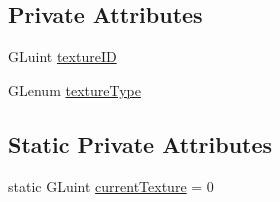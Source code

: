 \subsection*{Private Attributes}
\begin{DoxyCompactItemize}
\item 
G\+Luint \hyperlink{class_g_g_e_1_1_texture_a24eb48105f06bfe9c0b14d2ff84b50c6}{texture\+I\+D}
\item 
G\+Lenum \hyperlink{class_g_g_e_1_1_texture_a9fd9a4cf0a84fcd68b336c92d6d0514e}{texture\+Type}
\end{DoxyCompactItemize}
\subsection*{Static Private Attributes}
\begin{DoxyCompactItemize}
\item 
static G\+Luint \hyperlink{class_g_g_e_1_1_texture_ad1d7ae9c5c1c637d00d3002cf99e47e0}{current\+Texture} = 0
\end{DoxyCompactItemize}


